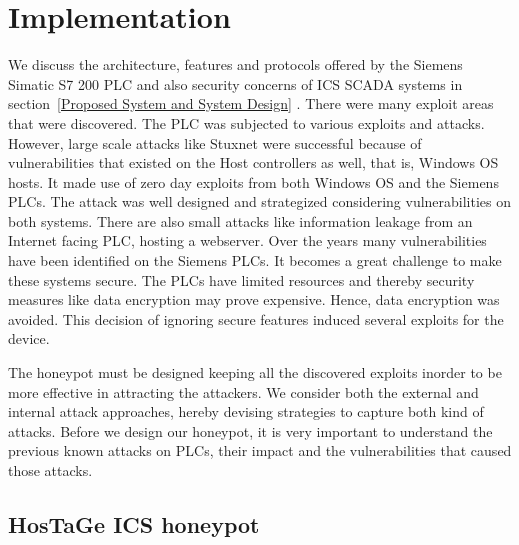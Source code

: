 \documentclass[article,msc=informatik,type=msc,colorback,accentcolor=tud9c]{tudthesis}
\begin{document}
	
		\newpage
	   \section{Implementation} \label{Implementation}

		We discuss the architecture, features and protocols offered by the Siemens Simatic S7 200 \ac{PLC} and also security concerns of \ac{ICS} \ac{SCADA} systems in section~\ref{Proposed System and System Design} . There were many exploit areas that were discovered. The \ac{PLC} was subjected to various exploits and attacks. However, large scale attacks like Stuxnet were successful because of vulnerabilities that existed on the Host controllers as well, that is, Windows OS hosts.  It made use of zero day exploits from both Windows OS and the Siemens \ac{PLC}s. The attack was well designed and strategized considering vulnerabilities on both systems. There are also small attacks like information leakage from an Internet facing \ac{PLC}, hosting a webserver. Over the years many vulnerabilities have been identified on the Siemens \ac{PLC}s. It becomes a great challenge to make these systems secure. The \ac{PLC}s have limited resources and thereby security measures like data encryption may prove expensive. Hence, data encryption was avoided. This decision of ignoring secure features induced several exploits for the device. 
		
		\vspace{3mm}
		The honeypot must be designed keeping all the discovered exploits inorder to be more effective in attracting the attackers. We consider both the external and internal attack approaches, hereby devising strategies to capture both kind of attacks. Before we design our honeypot, it is very important to understand the previous known attacks on \ac{PLC}s, their impact and the vulnerabilities that caused those attacks.
	 
	\vspace{5mm} 
 	\subsection{HosTaGe ICS honeypot} \label{HosTaGe ICS honeypot}
 	
\end{document}
